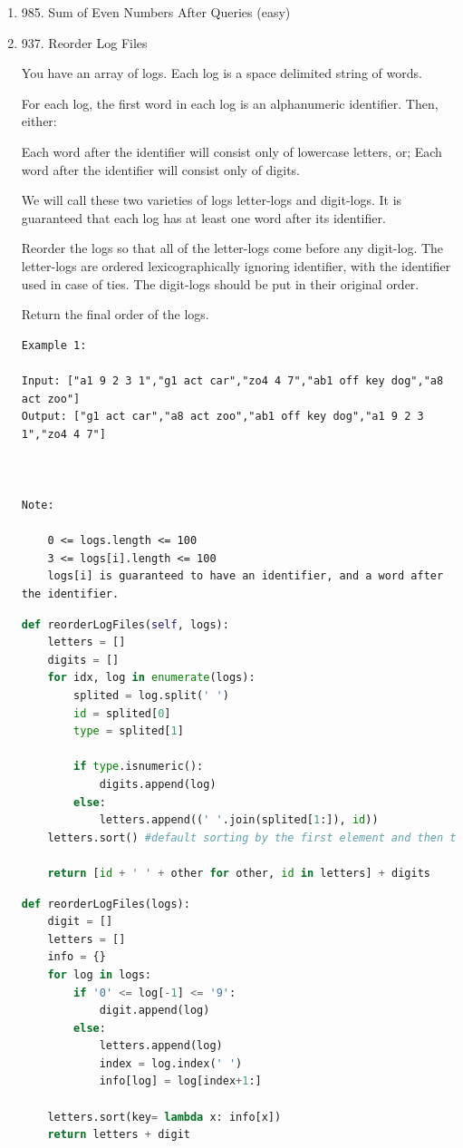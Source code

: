 \documentclass[../main.tex]{subfiles}
\begin{document}
\begin{enumerate}
    \item 985. Sum of Even Numbers After Queries (easy)
    \item 937. Reorder Log Files

You have an array of logs.  Each log is a space delimited string of words.

For each log, the first word in each log is an alphanumeric identifier.  Then, either:

    Each word after the identifier will consist only of lowercase letters, or;
    Each word after the identifier will consist only of digits.

We will call these two varieties of logs letter-logs and digit-logs.  It is guaranteed that each log has at least one word after its identifier.

Reorder the logs so that all of the letter-logs come before any digit-log.  The letter-logs are ordered lexicographically ignoring identifier, with the identifier used in case of ties.  The digit-logs should be put in their original order.

Return the final order of the logs.
\begin{lstlisting}
Example 1:

Input: ["a1 9 2 3 1","g1 act car","zo4 4 7","ab1 off key dog","a8 act zoo"]
Output: ["g1 act car","a8 act zoo","ab1 off key dog","a1 9 2 3 1","zo4 4 7"]

 

Note:

    0 <= logs.length <= 100
    3 <= logs[i].length <= 100
    logs[i] is guaranteed to have an identifier, and a word after the identifier.
\end{lstlisting}
\begin{lstlisting}[language=Python]
def reorderLogFiles(self, logs):
    letters = []
    digits = []
    for idx, log in enumerate(logs):
        splited = log.split(' ')
        id = splited[0]
        type = splited[1]
        
        if type.isnumeric():
            digits.append(log)
        else:
            letters.append((' '.join(splited[1:]), id))
    letters.sort() #default sorting by the first element and then the second in the tuple
        
    return [id + ' ' + other for other, id in letters] + digits
\end{lstlisting}
\begin{lstlisting}[language=Python]
def reorderLogFiles(logs):
    digit = []
    letters = []
    info = {}
    for log in logs:
        if '0' <= log[-1] <= '9':
            digit.append(log)
        else:
            letters.append(log)
            index = log.index(' ')
            info[log] = log[index+1:]

    letters.sort(key= lambda x: info[x])
    return letters + digit
\end{lstlisting}
\end{enumerate}
\end{document}
